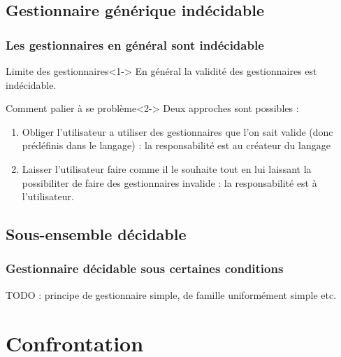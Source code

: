 \documentclass{beamer}
\begin{document}
\subsection{Gestionnaire générique indécidable}
\begin{frame}
	\frametitle{Les gestionnaires en général sont indécidable}
	\begin{block}{Limite des gestionnaires}<1->
		En général la validité des gestionnaires est \alert{indécidable}.
	\end{block}

	\begin{block}{Comment palier à se problème}<2->
		Deux approches sont possibles : 
		\begin{enumerate}
			\item Obliger l'utilisateur a utiliser des gestionnaires que l'on sait valide (donc prédéfinis dans le langage) : \alert{la responsabilité est au créateur du langage}
			\item Laisser l'utilisateur faire comme il le souhaite tout en lui laissant la possibiliter de faire des gestionnaires
			invalide : \alert{la responsabilité est à l'utilisateur}.
		\end{enumerate}
	\end{block}
\end{frame}

\subsection{Sous-ensemble décidable}
\begin{frame}
	\frametitle{Gestionnaire décidable sous certaines conditions}
	TODO : principe de gestionnaire simple, de famille uniformément simple etc.
\end{frame}

\section{Confrontation}
\end{document}
